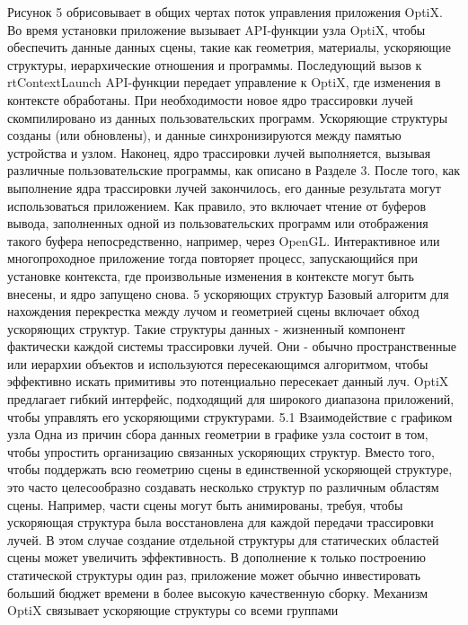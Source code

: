 Рисунок 5 обрисовывает в общих чертах поток управления приложения OptiX. Во время установки приложение вызывает API-функции узла OptiX, чтобы обеспечить данные данных сцены, такие как геометрия, материалы, ускоряющие структуры, иерархические отношения и программы. Последующий вызов к rtContextLaunch API-функции передает управление к OptiX, где изменения в контексте обработаны. При необходимости новое ядро трассировки лучей скомпилировано из данных пользовательских программ. Ускоряющие структуры созданы (или обновлены), и данные синхронизируются между памятью устройства и узлом. Наконец, ядро трассировки лучей выполняется, вызывая различные пользовательские программы, как описано в Разделе 3. После того, как выполнение ядра трассировки лучей закончилось, его данные результата могут использоваться приложением. Как правило, это включает чтение от буферов вывода, заполненных одной из пользовательских программ или отображения такого буфера непосредственно, например, через OpenGL. Интерактивное или многопроходное приложение тогда повторяет процесс, запускающийся при установке контекста, где произвольные изменения в контексте могут быть внесены, и ядро запущено снова.
5 ускоряющих структур
Базовый алгоритм для нахождения перекрестка между лучом и геометрией сцены включает обход ускоряющих структур. Такие структуры данных - жизненный компонент фактически каждой системы трассировки лучей. Они - обычно пространственные или иерархии объектов и используются пересекающимся алгоритмом, чтобы эффективно искать примитивы
это потенциально пересекает данный луч. OptiX предлагает гибкий интерфейс, подходящий для широкого диапазона приложений, чтобы управлять его ускоряющими структурами.
5.1 Взаимодействие с графиком узла
Одна из причин сбора данных геометрии в графике узла состоит в том, чтобы упростить организацию связанных ускоряющих структур. Вместо того, чтобы поддержать всю геометрию сцены в единственной ускоряющей структуре, это часто целесообразно создавать несколько структур по различным областям сцены. Например, части сцены могут быть анимированы, требуя, чтобы ускоряющая структура была восстановлена для каждой передачи трассировки лучей. В этом случае создание отдельной структуры для статических областей сцены может увеличить эффективность. В дополнение к только построению статической структуры один раз, приложение может обычно инвестировать больший бюджет времени в более высокую качественную сборку. Механизм OptiX связывает ускоряющие структуры со всеми группами
